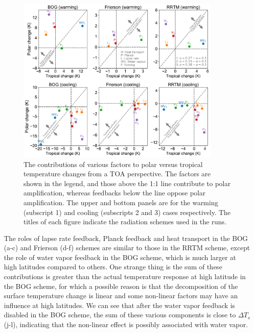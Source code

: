  \begin{figure}[ht]
    \centering
	\includegraphics[width=0.9\textwidth]{figs/polar_amp/contributions_to_polar_amplification.pdf}
	\caption[The contributions of various factors to polar versus tropical temperature changes from a TOA perspective]{The contributions of various factors to polar versus tropical temperature changes from a TOA perspective. The factors are shown in the legend, and those above the 1:1 line contribute to polar amplification, whereas feedbacks below the line oppose polar amplification. The upper and bottom panels are for the warming (subscript 1) and cooling (subscripts 2 and 3) cases respectively. The titles of each figure indicate the radiation schemes used in the runs.}
	\label{fig:contribution_pole_vs_tropic}
\end{figure}

The roles of lapse rate feedback, Planck feedback and heat transport in the BOG (a-c) and Frierson (d-f) schemes are similar to those in the RRTM scheme, except the role of water vapor feedback in the BOG scheme, which is much larger at high latitudes compared to others. One strange thing is the sum of these contributions is greater than the actual temperature response at high latitude in the BOG scheme, for which a possible reason is that the decomposition of the surface temperature change is linear and some non-linear factors may have an influence at high latitudes. We can see that after the water vapor feedback is disabled in the BOG scheme, the sum of these various components is close to $\Delta T_s$ (j-l), indicating that the non-linear effect is possibly associated with water vapor. 

